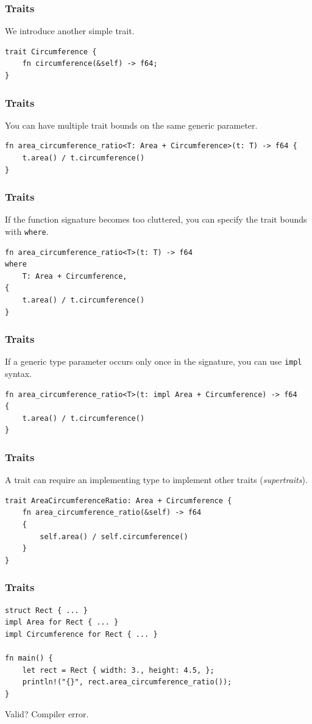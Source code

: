 \begin{frame}[fragile]
    \frametitle{Traits}
    We introduce another simple trait.
    \vfill
    \begin{verbatim}
trait Circumference {
    fn circumference(&self) -> f64;
}
    \end{verbatim}
\end{frame}

\begin{frame}[fragile]
    \frametitle{Traits}
    You can have multiple trait bounds on the same generic parameter.
    \vfill
    \begin{verbatim}
fn area_circumference_ratio<T: Area + Circumference>(t: T) -> f64 {
    t.area() / t.circumference()
}
    \end{verbatim}
\end{frame}

\begin{frame}[fragile]
    \frametitle{Traits}
    If the function signature becomes too cluttered, you can specify the trait bounds with \texttt{where}.
    \vfill
    \begin{verbatim}
fn area_circumference_ratio<T>(t: T) -> f64
where
    T: Area + Circumference,
{
    t.area() / t.circumference()
}
    \end{verbatim}
\end{frame}

\begin{frame}[fragile]
    \frametitle{Traits}
    If a generic type parameter occurs only once in the signature, you can use \texttt{impl} syntax.
    \vfill
    \begin{verbatim}
fn area_circumference_ratio<T>(t: impl Area + Circumference) -> f64
{
    t.area() / t.circumference()
}
    \end{verbatim}
\end{frame}

\begin{frame}[fragile]
    \frametitle{Traits}
    A trait can require an implementing type to implement other traits (\textit{supertraits}).
    \vfill
    \begin{verbatim}
trait AreaCircumferenceRatio: Area + Circumference {
    fn area_circumference_ratio(&self) -> f64
    {
        self.area() / self.circumference()
    }
}
    \end{verbatim}
\end{frame}

\begin{frame}[fragile]
    \frametitle{Traits}
    \begin{verbatim}
struct Rect { ... }
impl Area for Rect { ... }
impl Circumference for Rect { ... }

fn main() {
    let rect = Rect { width: 3., height: 4.5, };
    println!("{}", rect.area_circumference_ratio());
}
    \end{verbatim}
    \vfill
    Valid?
    \pause
    \vfill
    Compiler error.
\end{frame}

